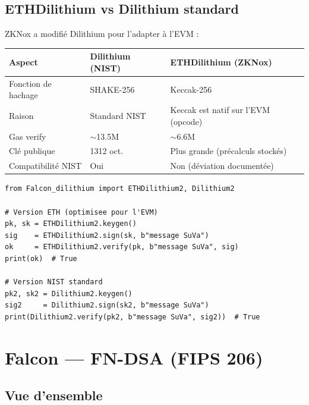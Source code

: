 \documentclass[12pt, a4paper]{article}
\begin{document}
\subsection{ETHDilithium vs Dilithium standard}

ZKNox a modifié Dilithium pour l'adapter à l'EVM :

\begin{center}
\renewcommand{\arraystretch}{1.4}
\begin{tabular}{lll}
  \toprule
  \textbf{Aspect} & \textbf{Dilithium (NIST)} & \textbf{ETHDilithium (ZKNox)} \\
  \midrule
  Fonction de hachage & SHAKE-256 & Keccak-256 \\
  Raison & Standard NIST & Keccak est natif sur l'EVM (opcode) \\
  Gas verify & $\sim$13.5M & $\sim$6.6M \\
  Clé publique & 1312 oct. & Plus grande (précalculs stockés) \\
  Compatibilité NIST & Oui & Non (déviation documentée) \\
  \bottomrule
\end{tabular}
\end{center}

\begin{lstlisting}[style=python, caption={Utilisation basique dans ce projet}]
from Falcon_dilithium import ETHDilithium2, Dilithium2

# Version ETH (optimisee pour l'EVM)
pk, sk = ETHDilithium2.keygen()
sig    = ETHDilithium2.sign(sk, b"message SuVa")
ok     = ETHDilithium2.verify(pk, b"message SuVa", sig)
print(ok)  # True

# Version NIST standard
pk2, sk2 = Dilithium2.keygen()
sig2     = Dilithium2.sign(sk2, b"message SuVa")
print(Dilithium2.verify(pk2, b"message SuVa", sig2))  # True
\end{lstlisting}

\section{Falcon --- FN-DSA (FIPS 206)}

\subsection{Vue d'ensemble}
\end{document}
